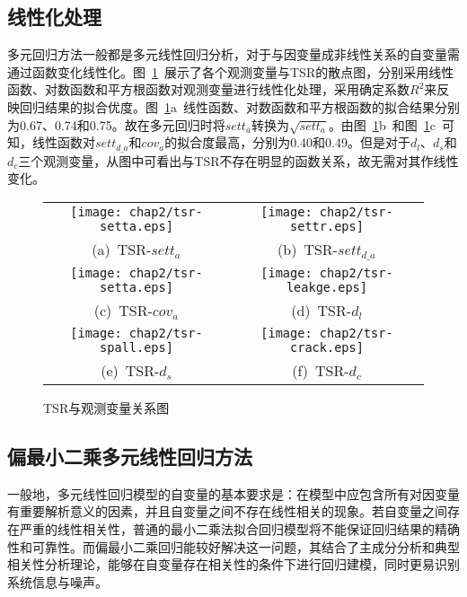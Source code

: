 \subsection{线性化处理}

多元回归方法一般都是多元线性回归分析，对于与因变量成非线性关系的自变量需通过函数变化线性化。图~\ref{fig:TSR与观测变量关系图}~展示了各个观测变量与TSR的散点图，分别采用线性函数、对数函数和平方根函数对观测变量进行线性化处理，采用确定系数$R^2$来反映回归结果的拟合优度。图~\ref{fig:TSR与观测变量关系图}a~线性函数、对数函数和平方根函数的拟合结果分别为0.67、0.74和0.75。故在多元回归时将${sett}_{a}$转换为$\sqrt{sett_a}$。由图~\ref{fig:TSR与观测变量关系图}b~和图~\ref{fig:TSR与观测变量关系图}c~可知，线性函数对$set{{t}_{d\_a}}$和${cov}_{a}$的拟合度最高，分别为0.40和0.49。但是对于${d}_{l}$、$d_s$和$d_c$三个观测变量，从图中可看出与TSR不存在明显的函数关系，故无需对其作线性变化。

\begin{figure}[htb!] 
    \centering 
    \begin{tabular}{cc} 
        \texttt{[image: chap2/tsr-setta.eps]} & \texttt{[image: chap2/tsr-settr.eps]}\\ 
        (a)~TSR-${sett}_{a}$ & (b)~TSR-$set{{t}_{d\_a}}$\\
        \texttt{[image: chap2/tsr-setta.eps]} & \texttt{[image: chap2/tsr-leakge.eps]}\\ 
        (c)~TSR-${cov}_{a}$ & (d)~TSR-${d}_{l}$\\
        \texttt{[image: chap2/tsr-spall.eps]} & \texttt{[image: chap2/tsr-crack.eps]}\\ 
        (e)~TSR-$d_s$ & (f)~TSR-$d_c$\\
    \end{tabular}
    \caption{TSR与观测变量关系图} 
    \label{fig:TSR与观测变量关系图} 
\end{figure}

\subsection{偏最小二乘多元线性回归方法}

一般地，多元线性回归模型的自变量的基本要求是：在模型中应包含所有对因变量有重要解析意义的因素，并且自变量之间不存在线性相关的现象。若自变量之间存在严重的线性相关性，普通的最小二乘法拟合回归模型将不能保证回归结果的精确性和可靠性。而偏最小二乘回归能较好解决这一问题，其结合了主成分分析和典型相关性分析理论，能够在自变量存在相关性的条件下进行回归建模，同时更易识别系统信息与噪声。

